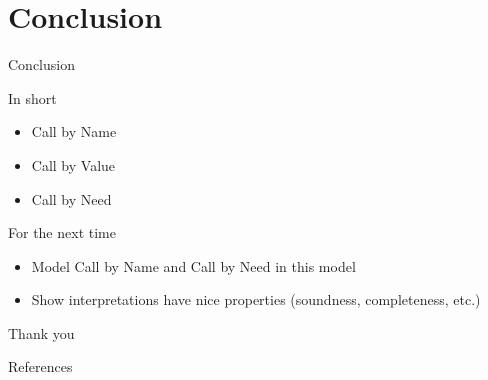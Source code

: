 \documentclass[10pt]{beamer}
\begin{document}



\section{Conclusion}

\begin{frame}[fragile]{Conclusion}
  \begin{alertblock}{In short}
    \begin{itemize}
      \item Call by Name
      \item Call by Value
      \item Call by Need
    \end{itemize}
  \end{alertblock}

  \begin{alertblock}{For the next time}
    \begin{itemize}
      \item Model Call by Name and Call by Need in this model
      \item Show interpretations have nice properties (soundness, completeness, etc.)
    \end{itemize}
  \end{alertblock}
\end{frame}

\begin{frame}[standout]
  Thank you
\end{frame}

\begin{frame}[allowframebreaks]{References}
  
  
\end{frame}
\end{document}
